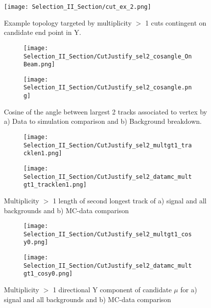\begin{figure}[t!]
  \centering
  \texttt{[image: Selection\_II\_Section/cut\_ex\_2.png]}
  \caption{ Example topology targeted by multiplicity $>$ 1 cuts contingent on candidate end point in Y. }
\label{fig:cut_ex_2}
\end{figure}

\begin{figure}[t!]
\centering
  \begin{subfigure}[t]{0.4\textwidth}
    \centering
\texttt{[image: Selection\_II\_Section/CutJustify\_sel2\_cosangle\_OnBeam.png]}
  \caption{ }
  \end{subfigure} 
  \hspace{20mm}
  \begin{subfigure}[t]{0.4\textwidth}
    \centering
\texttt{[image: Selection\_II\_Section/CutJustify\_sel2\_cosangle.png]}
  \caption{ }
  \end{subfigure} 
\caption{Cosine of the angle between largest 2 tracks associated to vertex by a) Data to simulation comparison and b) Background breakdown. }
\label{fig:cutjust_sel2_cosangle}
\end{figure}

\begin{figure}[t!]
\centering
 \begin{subfigure}[t]{0.4\textwidth}
    \centering
\texttt{[image: Selection\_II\_Section/CutJustify\_sel2\_multgt1\_tracklen1.png]}
 \caption{ }
  \end{subfigure} 
  \hspace{20mm}
  \begin{subfigure}[t]{0.4\textwidth}
    \centering
\texttt{[image: Selection\_II\_Section/CutJustify\_sel2\_datamc\_multgt1\_tracklen1.png]}
 \caption{ }
  \end{subfigure} 
\caption{Multiplicity $>$ 1 length of second longest track of a) signal and all backgrounds and b) MC-data comparison }
\label{fig:cutjust_sel2_multgt1_tracklen1}
\end{figure}

\begin{figure}[t!]
\centering
  \begin{subfigure}[t]{0.4\textwidth}
    \centering
\texttt{[image: Selection\_II\_Section/CutJustify\_sel2\_multgt1\_cosy0.png]}
 \caption{ }
  \end{subfigure} 
  \hspace{20mm}
  \begin{subfigure}[t]{0.4\textwidth}
    \centering
\texttt{[image: Selection\_II\_Section/CutJustify\_sel2\_datamc\_multgt1\_cosy0.png]}
 \caption{ }
  \end{subfigure} 
\caption{Multiplicity $>$ 1 directional Y component of candidate $\mu$ for a) signal and all backgrounds and b) MC-data comparison }
\label{fig:cutjust_sel2_multgt1_dcosy}
\end{figure}


